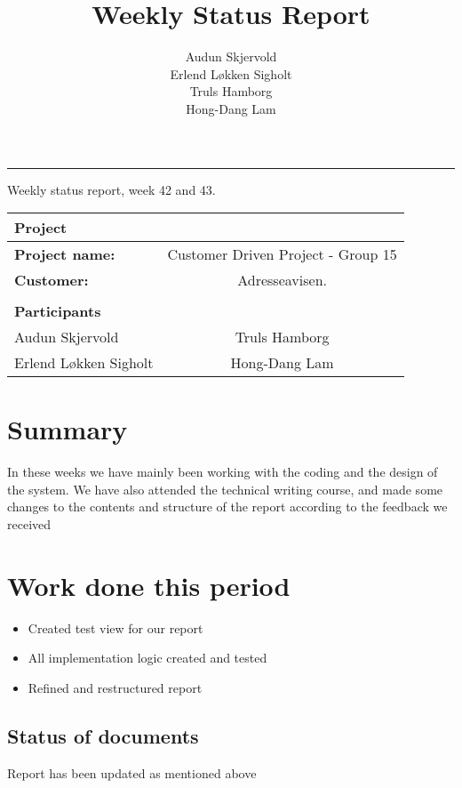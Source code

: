 \documentclass[12pt, a4paper]{article}
\title{Weekly Status Report}
\author{Audun Skjervold \\ Erlend Løkken Sigholt \\ Truls Hamborg \\ Hong-Dang Lam}
\begin{document}
\maketitle
\newpage

 
\newpage
\hrule
\newpage

\begin{center}
Weekly status report, week 42 and 43.
  \begin{tabular}{| l  c |}
    \hline
    Project & \\ \hline
    \textbf{Project name:} & Customer Driven Project - Group 15 \\
    \textbf{Customer:} & Adresseavisen. \\ \hline
     & \\
     \textbf{Participants} & \\ \hline
     Audun Skjervold & Truls Hamborg \\
     Erlend Løkken Sigholt & Hong-Dang Lam \\
    \hline
  \end{tabular}
  \end{center}

\section{Summary}
In these weeks we have mainly been working with the coding and the design of the system. We have also attended the technical writing course, and made some changes to the contents and structure of the report according to the feedback we received 
\section{Work done this period}
\begin{itemize}
\item Created test view for our report
\item All implementation logic created and tested
\item Refined and restructured report
\end{itemize}
\subsection{Status of documents}
Report has been updated as mentioned above
\end{document}
